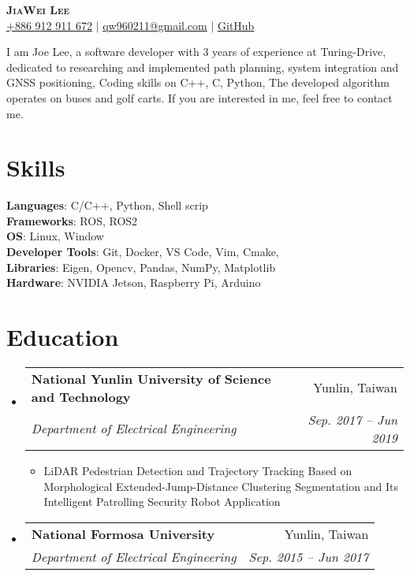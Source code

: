 \documentclass[letterpaper,11pt]{article}
\makeatletter
\newcommand{\resumeItem}[1]{
  \item\small{
    {#1 \vspace{-2pt}}
  }
}
\newcommand{\resumeSubheading}[4]{
  \vspace{-2pt}\item
    \begin{tabular*}{0.97\textwidth}[t]{l@{\extracolsep{\fill}}r}
      \textbf{#1} & #2 \\
      \textit{\small#3} & \textit{\small #4} \\
    \end{tabular*}\vspace{-7pt}
}
\newcommand{\resumeSubHeadingListStart}{\begin{itemize}[leftmargin=0.15in, label={}]}
\newcommand{\resumeSubHeadingListEnd}{\end{itemize}}
\newcommand{\resumeItemListStart}{\begin{itemize}}
\newcommand{\resumeItemListEnd}{\end{itemize}\vspace{-5pt}}
\makeatother
\begin{document}
\begin{center}
    \textbf{\Huge \scshape JiaWei Lee} \\ \vspace{3pt}
    \faMobile \hspace{.5pt} \href{tel:0912911672}{\color{blue}+886 912 911 672} $|$
    \faAt \hspace{.5pt} \href{mailto:qw960211@gmail.com}{\color{blue}qw960211@gmail.com} $|$
    \faGithub \hspace{.5pt} \href{https://github.com/EC404}{\color{blue}GitHub}
\end{center}

{I am Joe Lee, a software developer with 3 years of experience at Turing-Drive, dedicated to researching and implemented path planning, system integration and GNSS positioning, Coding skills on C++, C, Python, The developed algorithm operates on buses and golf carts. If you are interested in me, feel free to contact me.} \\

\section{\textbf{Skills}}
 \begin{itemize}[leftmargin=0.15in, label={}]
    \small{\item{
     \textbf{Languages}{: C/C++, Python, Shell scrip} \\
     \textbf{Frameworks}{: ROS, ROS2} \\
     \textbf{OS}{: Linux, Window} \\
     \textbf{Developer Tools}{: Git, Docker, VS Code, Vim, Cmake, } \\
     \textbf{Libraries}{: Eigen, Opencv, Pandas, NumPy, Matplotlib} \\
     \textbf{Hardware}{: NVIDIA Jetson, Raspberry Pi, Arduino}
    }}
 \end{itemize}

\section{\textbf{Education}}
  \vspace{3pt}
  \resumeSubHeadingListStart
    \resumeSubheading
      {National Yunlin University of  Science and Technology}{Yunlin, Taiwan}
      {Department of Electrical Engineering}{Sep. 2017 -- Jun 2019}
      \resumeItemListStart
        \resumeItem{LiDAR Pedestrian Detection and Trajectory Tracking Based on Morphological Extended-Jump-Distance  Clustering Segmentation and Its Intelligent Patrolling  Security Robot Application}
      \resumeItemListEnd
    \resumeSubheading
      {National Formosa University}{Yunlin, Taiwan}
      {Department of Electrical Engineering}{Sep. 2015 -- Jun 2017}
  \resumeSubHeadingListEnd
\end{document}
